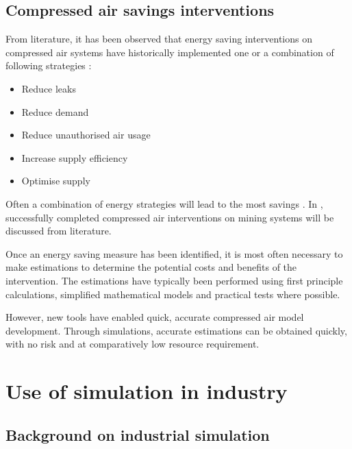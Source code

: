 	\subsection{Compressed air savings interventions}
		From literature, it has been observed that energy saving interventions on compressed air systems have historically implemented one or a combination of following strategies \cite{Snyman2011Masters}:
		\begin{itemize}
			\item Reduce leaks
			\item Reduce demand
			\item Reduce unauthorised air usage
			\item Increase supply efficiency
			\item Optimise supply
		\end{itemize}
	 Often a combination of energy strategies will lead to the most savings \cite{Marais2012PhD}. In , successfully completed compressed air interventions on mining systems will be discussed from literature.
	 \par 
	 Once an energy saving measure has been identified, it is most often necessary to make estimations to determine the potential costs and benefits of the intervention. The estimations have typically been performed using first principle calculations, simplified mathematical models and practical tests where possible. 
	 \par 
	 However, new tools have enabled quick, accurate compressed air model development. Through simulations, accurate estimations can be obtained quickly, with no risk and at comparatively low resource requirement.
\section{Use of simulation in industry }
	\subsection{Background on industrial simulation}
	
